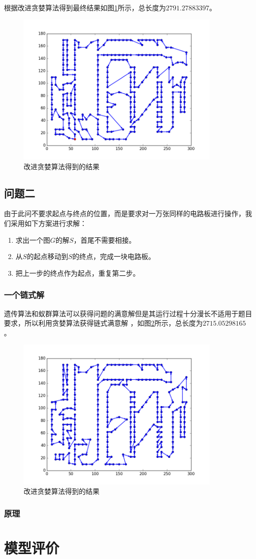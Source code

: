 \documentclass[fontset=windows,a4paper,12pt]{ctexart}
\begin{document}
        根据改进贪婪算法得到最终结果如图\ref{fig:greedy}所示，总长度为$2791.27883397$。
		\begin{figure}[htbp]
			\centering
			\includegraphics[width=10cm]{pic/greedy_result.png}
			\caption{改进贪婪算法得到的结果}
			\label{fig:greedy}
		\end{figure}

    \subsection{问题二}
	  由于此问不要求起点与终点的位置，而是要求对一万张同样的电路板进行操作，我们采用如下方案进行求解：
	  \begin{enumerate}
	  	\item 求出一个图$G$的解$S$，首尾不需要相接。
	  	\item 从$S$的起点移动到$S$的终点，完成一块电路板。
	  	\item 把上一步的终点作为起点，重复第二步。
	  \end{enumerate}
      \subsubsection{一个链式解}
        遗传算法和蚁群算法可以获得问题的满意解但是其运行过程十分漫长不适用于题目要求，所以利用贪婪算法获得链式满意解
        ，如图\ref{fig:greedy2}所示，总长度为$2715.05298165$。
        \begin{figure}[!htbp]
        	\centering
        	\includegraphics[width=10cm]{pic/greedy_result2.png}
        	\caption{改进贪婪算法得到的结果}
        	\label{fig:greedy2}
        \end{figure}
      \subsubsection{原理}
    \section{模型评价}
  
  
\end{document}
